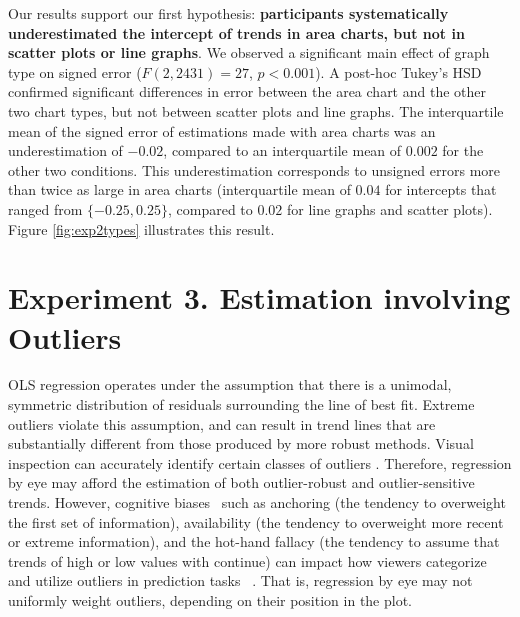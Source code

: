 \documentclass{sigchi}
\begin{document}
Our results support our first hypothesis: \textbf{participants systematically underestimated the intercept of trends in area charts, but not in scatter plots or line graphs}. We observed a significant main effect of graph type on signed error ($F(2,2431)=27$, $p<0.001$). A post-hoc Tukey's HSD confirmed significant differences in error between the area chart and the other two chart types, but not between scatter plots and line graphs. The interquartile mean of the signed error of estimations made with area charts was an underestimation of $-0.02$, compared to an interquartile mean of $0.002$ for the other two conditions. This underestimation corresponds to unsigned errors more than twice as large in area charts (interquartile mean of $0.04$ for intercepts that ranged from $\{-0.25,0.25\}$, compared to $0.02$ for line graphs and scatter plots). Figure \ref{fig:exp2types} illustrates this result.

\section{Experiment 3. Estimation involving Outliers}

\outlierFig

\outliersFig
OLS regression operates under the assumption that there is a unimodal, symmetric distribution of residuals surrounding the line of best fit. Extreme outliers violate this assumption, and can result in trend lines that are substantially different from those produced by more robust methods. Visual inspection can accurately identify certain classes of outliers \cite{albers2014task}. Therefore, regression by eye may afford the estimation of both outlier-robust and outlier-sensitive trends. However, cognitive biases~\cite{tversky1975judgment} such as anchoring (the tendency to overweight the first set of information), availability (the tendency to overweight more recent or extreme information), and the hot-hand fallacy (the tendency to assume that trends of high or low values with continue) can impact how viewers categorize and utilize outliers in prediction tasks ~\cite{campbell2009anchoring, ji2001culture}. That is, regression by eye may not uniformly weight outliers, depending on their position in the plot.
\end{document}

